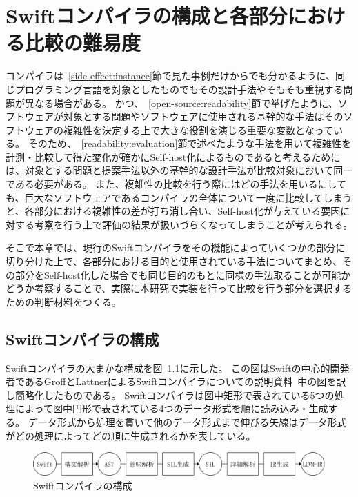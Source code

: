 \chapter{Swiftコンパイラの構成と各部分における比較の難易度}
\label{refinement}

コンパイラは~\ref{side-effect:instance}節で見た事例だけからでも分かるように、同じプログラミング言語を対象としたものでもその設計手法やそもそも重視する問題が異なる場合がある。
かつ、~\ref{open-source:readability}節で挙げたように、ソフトウェアが対象とする問題やソフトウェアに使用される基幹的な手法はそのソフトウェアの複雑性を決定する上で大きな役割を演じる重要な変数となっている。
そのため、~\ref{readability:evaluation}節で述べたような手法を用いて複雑性を計測・比較して得た変化が確かにSelf-host化によるものであると考えるためには、対象とする問題と提案手法以外の基幹的な設計手法が比較対象において同一である必要がある。
また、複雑性の比較を行う際にはどの手法を用いるにしても、巨大なソフトウェアであるコンパイラの全体について一度に比較してしまうと、各部分における複雑性の差が打ち消し合い、Self-host化が与えている要因に対する考察を行う上で評価の結果が扱いづらくなってしまうことが考えられる。

そこで本章では、現行のSwiftコンパイラをその機能によっていくつかの部分に切り分けた上で、各部分における目的と使用されている手法についてまとめ、その部分をSelf-host化した場合でも同じ目的のもとに同様の手法取ることが可能かどうか考察することで、実際に本研究で実装を行って比較を行う部分を選択するための判断材料をつくる。

\section{Swiftコンパイラの構成}
\label{refinement:structure}

Swiftコンパイラの大まかな構成を図~\ref{img:swift-compiler-process}に示した。
この図はSwiftの中心的開発者であるGroffとLattnerによるSwiftコンパイラについての説明資料~\cite{sil}中の図を訳し簡略化したものである。
Swiftコンパイラは図中矩形で表されている5つの処理によって図中円形で表されている4つのデータ形式を順に読み込み・生成する。
データ形式から処理を貫いて他のデータ形式まで伸びる矢線はデータ形式がどの処理によってどの順に生成されるかを表している。

\begin{figure}
    \begin{center}
        \includegraphics[scale=0.5]{./img/swift_compiler_process.png}
        \caption{Swiftコンパイラの構成}
        \label{img:swift-compiler-process}
    \end{center}
\end{figure}

